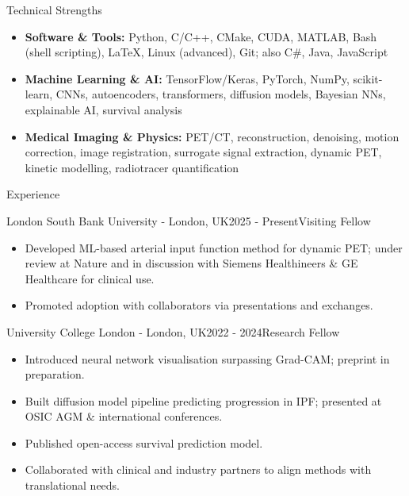 \documentclass{cv}
\begin{document}
    
    \begin{spacing}{1.1}
        \begin{rSection}{Technical Strengths}
            \begin{itemize}
                \item \textbf{Software \& Tools:} Python, C/C++, CMake, CUDA, MATLAB, Bash (shell scripting), LaTeX, Linux (advanced), Git; also C\#, Java, JavaScript
                \item \textbf{Machine Learning \& AI:} TensorFlow/Keras, PyTorch, NumPy, scikit-learn, CNNs, autoencoders, transformers, diffusion models, Bayesian NNs, explainable AI, survival analysis
                \item \textbf{Medical Imaging \& Physics:} PET/CT, reconstruction, denoising, motion correction, image registration, surrogate signal extraction, dynamic PET, kinetic modelling, radiotracer quantification
            \end{itemize}
        \end{rSection}
        
        \begin{rSection}{Experience}
            \item \begin{rSubsection}{London South Bank University \textnormal{- London, UK}}{2025 - Present}{Visiting Fellow}{}
                \item \begin{itemize}
                    \item Developed ML-based arterial input function method for dynamic PET; under review at Nature and in discussion with Siemens Healthineers \& GE Healthcare for clinical use.
                    \item Promoted adoption with collaborators via presentations and exchanges.
                \end{itemize}
            \end{rSubsection}
            
            \item \begin{rSubsection}{University College London \textnormal{- London, UK}}{2022 - 2024}{Research Fellow}{}
                \item \begin{itemize}
                    \item Introduced neural network visualisation surpassing Grad-CAM; preprint in preparation.
                    \item Built diffusion model pipeline predicting progression in IPF; presented at OSIC AGM \& international conferences.
                    \item Published open-access survival prediction model.
                    \item Collaborated with clinical and industry partners to align methods with translational needs.
                \end{itemize}
            \end{rSubsection}
            

\end{rSection}
\end{spacing}
\end{document}
